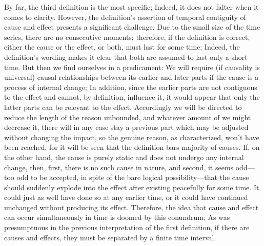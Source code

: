 \documentclass[a4paper,12pt]{book}[2004/02/16]
\theoremstyle{ilemma}
\theoremstyle{itheorem}
\theoremstyle{iother}
\theoremstyle{icorollary}
\theoremstyle{numcorollary}
\theoremstyle{idefinition}
\begin{document}
By far, the third definition is the most specific; Indeed, it does not falter when it comes to clarity. However, the definition's assertion of temporal contiguity of cause and effect presents a significant challenge. Due to the small size of the time series, there are no consecutive moments; therefore, if the definition is correct, either the cause or the effect, or both, must last for some time; Indeed, the definition's wording makes it clear that both are assumed to last only a short time. But then we find ourselves in a predicament: We will require (if causality is universal) causal relationships between its earlier and later parts if the cause is a process of internal change; In addition, since the earlier parts are not contiguous to the effect and cannot, by definition, influence it, it would appear that only the latter parts can be relevant to the effect. Accordingly we will be directed to reduce the length of the reason
unbounded, and whatever amount of we might decrease it, there will in any case
stay a previous part which may be adjusted without changing the
impact, so the genuine reason, as characterized, won't have been
reached, for it will be seen that the definition bars
majority of causes. If, on the other hand, the cause is purely static and does not undergo any internal change, then, first, there is no such cause in nature, and second, it seems odd—too odd to be accepted, in spite of the bare logical possibility—that the cause should suddenly explode into the effect after existing peacefully for some time. It could just as well have done so at any earlier time, or it could have continued unchanged without producing its effect. Therefore, the idea that cause and effect can occur simultaneously in time is doomed by this conundrum; As was presumptuous in the previous interpretation of the first definition, if there are causes and effects, they must be separated by a finite time interval.
\end{document}
